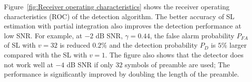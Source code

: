 
Figure~\ref{fig:Receiver operating characteristics} shows the receiver
operating characteristics (ROC) of the detection algorithm. 
The better accuracy of SL estimation with partial integration also
improves the detection performance  at low SNR.
For example,
at $-2$ dB SNR, $\gamma=0.44$, the false alarm probability $P_{FA}$ of SL with $v=32$ is reduced $0.2\%$ and 
the detection probability $P_{D}$ is $5\%$ larger compared with the SL with $v{=}1$. 
The figure also shows that the detector does not work well at $-4$ dB SNR if only $32$ symbols of preamble are used;  
The performance is significantly improved by doubling the length of
the preamble.
